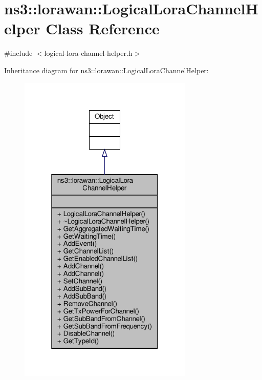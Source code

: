 \hypertarget{classns3_1_1lorawan_1_1LogicalLoraChannelHelper}{}\section{ns3\+:\+:lorawan\+:\+:Logical\+Lora\+Channel\+Helper Class Reference}
\label{classns3_1_1lorawan_1_1LogicalLoraChannelHelper}


{\ttfamily \#include $<$logical-\/lora-\/channel-\/helper.\+h$>$}



Inheritance diagram for ns3\+:\+:lorawan\+:\+:Logical\+Lora\+Channel\+Helper\+:
\nopagebreak
\begin{figure}[H]
\begin{center}
\leavevmode
\includegraphics[width=235pt]{classns3_1_1lorawan_1_1LogicalLoraChannelHelper__inherit__graph}
\end{center}
\end{figure}


